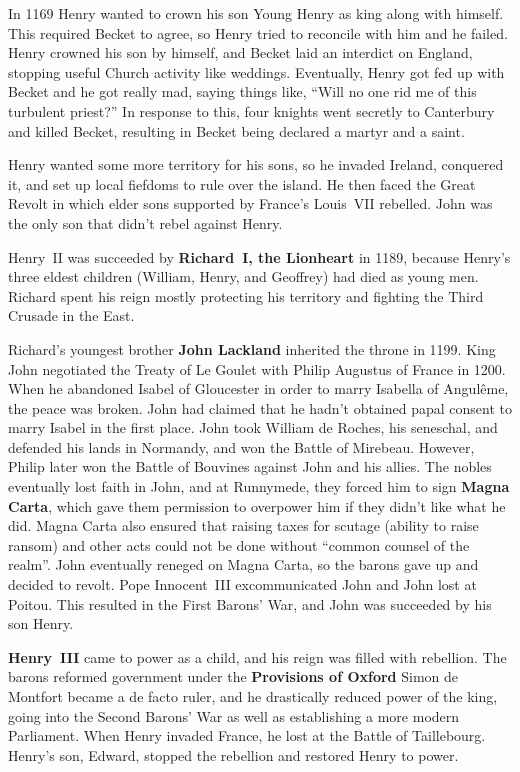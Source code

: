 In 1169 Henry wanted to crown his son Young Henry as king along with himself.
This required Becket to agree, so Henry tried to reconcile with him and he failed.
Henry crowned his son by himself, and Becket laid an interdict on England,
stopping useful Church activity like weddings.
Eventually, Henry got fed up with Becket and he got really mad, saying things like,
``Will no one rid me of this turbulent priest?''
In response to this, four knights went secretly to Canterbury and killed Becket,
resulting in Becket being declared a martyr and a saint.

Henry wanted some more territory for his sons, so he invaded Ireland, conquered it,
and set up local fiefdoms to rule over the island.
He then faced the Great Revolt in which elder sons supported by France's Louis~VII rebelled.
John was the only son that didn't rebel against Henry.

Henry~II was succeeded by \textbf{Richard~I, the Lionheart} in 1189,
because Henry's three eldest children (William, Henry, and Geoffrey) had died as young men.
Richard spent his reign mostly protecting his territory and fighting the Third Crusade in the East.

Richard's youngest brother \textbf{John Lackland} inherited the throne in 1199.
King John negotiated the Treaty of Le Goulet with Philip Augustus of France in 1200.
When he abandoned Isabel of Gloucester in order to marry Isabella of Angul\^eme, the peace was broken.
John had claimed that he hadn't obtained papal consent to marry Isabel in the first place.
John took William de Roches, his seneschal, and defended his lands in Normandy, and won the Battle of Mirebeau.
However, Philip later won the Battle of Bouvines against John and his allies.
The nobles eventually lost faith in John, and at Runnymede, they forced him to sign \textbf{Magna Carta},
which gave them permission to overpower him if they didn't like what he did.
Magna Carta also ensured that raising taxes for scutage (ability to raise ransom)
and other acts could not be done without ``common counsel of the realm''.
John eventually reneged on Magna Carta, so the barons gave up and decided to revolt.
Pope Innocent~III excommunicated John and John lost at Poitou.
This resulted in the First Barons' War, and John was succeeded by his son Henry.

\textbf{Henry~III} came to power as a child, and his reign was filled with rebellion.
The barons reformed government under the \textbf{Provisions of Oxford}
Simon de Montfort became a de facto ruler,
and he drastically reduced power of the king,
going into the Second Barons' War as well as establishing a more modern Parliament.
When Henry invaded France, he lost at the Battle of Taillebourg.
Henry's son, Edward, stopped the rebellion and restored Henry to power.

